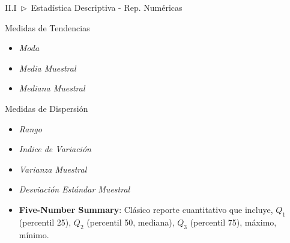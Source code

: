 \documentclass[xcolor=dvipsnames]{beamer}
\begin{document}
    \begin{frame}{II.I~$\rhd$~Estadística Descriptiva - Rep. Numéricas}
        \begin{block}{Medidas de Tendencias}
            \begin{itemize}
                \item \textit{Moda}
                \item \textit{Media Muestral}
                \item \textit{Mediana Muestral}
            \end{itemize}
        \end{block}
        \vspace{2mm}%
        \begin{block}{Medidas de Dispersión}
            \begin{itemize}
                \item \textit{Rango}
                \item \textit{Indice de Variación}
                \item \textit{Varianza Muestral}
                \item \textit{Desviación Estándar Muestral}
            \end{itemize}
        \end{block}
        \vspace{2mm}%
        \begin{itemize}
            \item \textbf{Five-Number Summary}: Clásico reporte cuantitativo que incluye, $Q_{1}$ (percentil 25), $Q_{2}$ (percentil 50, mediana), $Q_{3}$ (percentil 75), máximo, mínimo.
        \end{itemize}
    \end{frame}
\end{document}
